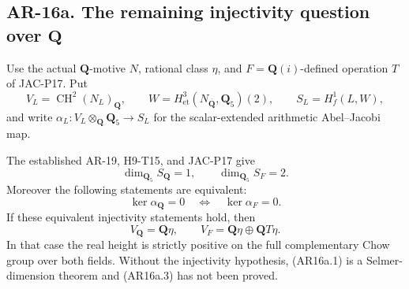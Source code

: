 \subsection*{AR-16a. The remaining injectivity question over \(\mathbf Q\)}

Use the actual \(\mathbf Q\)-motive \(N\), rational class \(\eta\),
and \(F=\mathbf Q(i)\)-defined operation \(T\) of JAC-P17.
Put
\[
 V_L=\operatorname{CH}^2(N_L)_{\mathbf Q},\qquad
 W=H^3_{\mathrm{et}}(N_{\overline{\mathbf Q}},\mathbf Q_5)(2),
 \qquad
 S_L=H^1_f(L,W),
\]
and write \(\alpha_L:V_L\otimes_{\mathbf Q}\mathbf Q_5\to S_L\)
for the scalar-extended arithmetic Abel--Jacobi map.

\begin{corollary}[AR-16a]\label{ar16a}
The established AR-19, H9-T15, and JAC-P17 give
\[
                   \dim_{\mathbf Q_5}S_{\mathbf Q}=1,
       \qquad      \dim_{\mathbf Q_5}S_F=2.                \tag{AR16a.1}
\]
Moreover the following statements are equivalent:
\[
             \ker\alpha_{\mathbf Q}=0
                    \quad\Longleftrightarrow\quad
             \ker\alpha_F=0.                             \tag{AR16a.2}
\]
If these equivalent injectivity statements hold, then
\[
             V_{\mathbf Q}=\mathbf Q\eta,
       \qquad V_F=\mathbf Q\eta\oplus\mathbf Q T\eta.
                                                               \tag{AR16a.3}
\]
In that case the real height is strictly positive on the full
complementary Chow group over both fields. Without the
injectivity hypothesis, (AR16a.1) is a Selmer-dimension theorem
and (AR16a.3) has not been proved.
\end{corollary}

